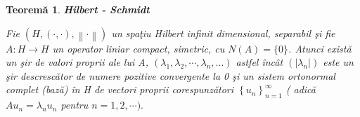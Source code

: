 \documentclass[a4paper,12pt,oneside]{report}
\newtheorem{theorem}{Teorem\u a}
\begin{document}
\begin{theorem}
\textbf{Hilbert - Schmidt}

\noindent Fie \(\left ( H, \left ( \cdot ,\cdot  \right ), \left \| \cdot  \right \| \right )\) un spa\c{t}iu Hilbert infinit dimensional, separabil \c{s}i fie \(A:H\rightarrow H\) un operator liniar compact, simetric, cu \(N\left ( A \right ) =\{ 0 \}\). Atunci exist\u{a} un \c{s}ir de valori proprii ale lui A, \(\left ( \lambda _{1},\lambda _{2},\cdots,\lambda _{n},... \right )\) astfel \^{i}nc\^{a}t \(\left ( \left | \lambda _{n} \right | \right )\) este un \c{s}ir descresc\u{a}tor de numere pozitive convergente la 0 \c{s}i un sistem ortonormal complet (baz\u{a}) \^{i}n H de vectori proprii corespunz\u{a}tori  \(\left \{ u_{n} \right \}_{n=1}^{\infty }\) ( adic\u{a} \( Au_{n} = \lambda _{n}u_{n} \) pentru \( n = 1,2,\cdots).\)
\end{theorem}
\end{document}
